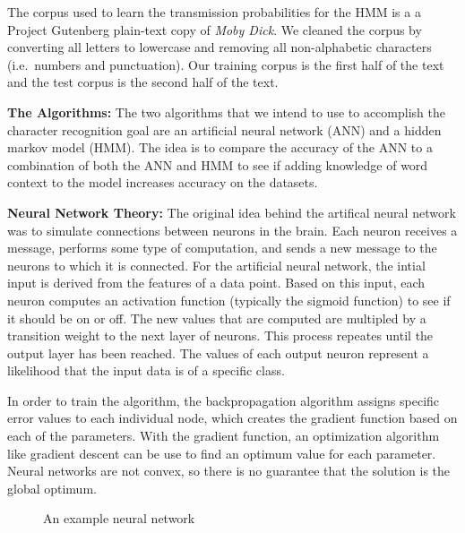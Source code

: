 \documentclass[11pt,letterpaper]{article}
\begin{document}
The corpus used to learn the transmission probabilities for the HMM is a a Project Gutenberg
plain-text copy of \emph{Moby Dick}. We cleaned the corpus by converting all letters to lowercase
and removing all non-alphabetic characters (i.e.\ numbers and punctuation). Our training corpus is
the first half of the text and the test corpus is the second half of the text.

{\bf The Algorithms:} The two algorithms that we intend to use to accomplish the character recognition goal are an
artificial neural network (ANN) and a hidden markov model (HMM). The idea is to compare the accuracy
of the ANN to a combination of both the ANN and HMM to see if adding knowledge of word context to
the model increases accuracy on the datasets.

{\bf Neural Network Theory:} The original idea behind the artifical neural network was to simulate connections between neurons in
the brain. Each neuron receives a message, performs some type of computation, and sends a new
message to the neurons to which it is connected. For the artificial neural network, the intial input
is derived from the features of a data point. Based on this input, each neuron computes an
activation function (typically the sigmoid function) to see if it should be on or off. The new
values that are computed are multipled by a transition weight to the next layer of neurons. This
process repeates until the output layer has been reached. The values of each output neuron represent
a likelihood that the input data is of a specific class.

In order to train the algorithm, the backpropagation algorithm assigns specific error values to each
individual node, which creates the gradient function based on each of the parameters. With the
gradient function, an optimization algorithm like gradient descent can be use to find an optimum
value for each parameter. Neural networks are not convex, so there is no guarantee that the solution
is the global optimum.

\begin{figure}[h]
\centering
\caption{An example neural network}
\end{figure}
\end{document}

